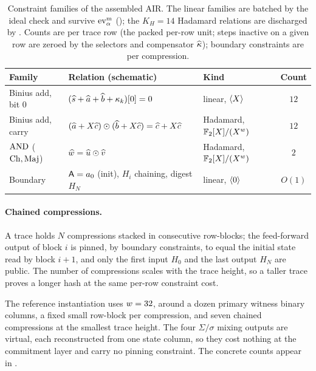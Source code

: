 \begin{table}[ht]
\centering
\renewcommand{\arraystretch}{1.3}
\caption{Constraint families of the assembled AIR. The linear families are
batched by the ideal check and survive $\operatorname{ev}^{\mathrm{m}}_{\alpha}$ (); the
$K_H=14$ Hadamard relations are discharged by . Counts
are per trace row (the packed per-row unit; steps inactive on a given row
are zeroed by the selectors and compensator $\widehat{\kappa}$); boundary
constraints are per compression.}
\label{tab:constraints}
\begin{tabular}{@{}l l l c@{}}
\toprule
Family & Relation (schematic) & Kind & Count \\
\midrule
Binius add, bit $0$ & $(\widehat{s}+\widehat{a}+\widehat{b}+\kappa_k)[0]=0$ & linear, $\langle X \rangle$ & $12$ \\
Binius add, carry & $(\widehat{a}+X\widehat{c})\odot(\widehat{b}+X\widehat{c})=\widehat{c}+X\widehat{c}$ & Hadamard, $\mathbb{F}_2[X]/(X^{w})$ & $12$ \\
$\operatorname{AND}$ ($\operatorname{Ch},\operatorname{Maj}$) & $\widehat{w}=\widehat{u}\odot\widehat{v}$ & Hadamard, $\mathbb{F}_2[X]/(X^{w})$ & $2$ \\
Boundary & $\mathsf{A}=a_0$ (init), $H_i$ chaining, digest $H_N$ & linear, $\langle 0 \rangle$ & $O(1)$ \\
\bottomrule
\end{tabular}
\end{table}

\paragraph{Chained compressions.} A trace holds $N$ compressions stacked
in consecutive row-blocks; the feed-forward output of block $i$ is pinned,
by boundary constraints, to equal the initial state read by block $i+1$,
and only the first input $H_0$ and the last output $H_N$ are public. The
number of compressions scales with the trace height, so a taller trace
proves a longer hash at the same per-row constraint cost.

\begin{remark}
\label{rem:deployed-shape}
The reference instantiation uses $w=32$, around a dozen primary
witness binary columns, a fixed small row-block per compression, and
seven chained compressions at the smallest trace height. The four
$\Sigma/\sigma$ mixing outputs are virtual, each reconstructed from one
state column, so they cost nothing at the commitment layer and carry no
pinning constraint. The concrete counts appear in .
\end{remark}

